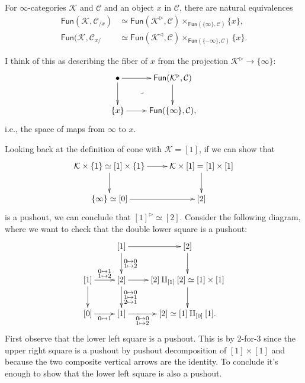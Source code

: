 \begin{lemma}
\label{lemma-pullback-cone}
For $\infty$-categories $\mathcal{K}$ and $\mathcal{C}$ 
and an object $x$ in $\mathcal{C}$,
there are natural equivalences
\begin{align*}
\mathsf{Fun}(\mathcal{K},\mathcal{C}_{/x})&\simeq
\mathsf{Fun}(\mathcal{K}^{\triangleright},\mathcal{C})
\times_{\mathsf{Fun}(\{\infty\},\mathcal{C})}\{x\},\\
\mathsf{Fun}(\mathcal{K},\mathcal{C}_{x/}&
\simeq \mathsf{Fun}(\mathcal{K}^{\triangleleft},\mathcal{C})
\times_{\mathsf{Fun}(\{-\infty\},\mathcal{C})}\{x\}.
\end{align*}
\end{lemma}

\noindent
I think of this as describing the fiber of $x$ from the
projection $\mathcal{K}^{\triangleright} \to \{\infty\}$:
$$
\xymatrix{
\bullet\ar[r]\ar[d]\ar@{}[dr]|-{\lrcorner}
&\mathsf{Fun}(\mathcal{K}^{\triangleright},\mathcal{C})\ar[d]\\
\{x\}\ar[r]&\mathsf{Fun}(\{\infty\},\mathcal{C}),
}
$$
i.e., the space of maps from $\infty$ to $x$.

\medskip\noindent
Looking back at the definition of cone
with $\mathcal{K}=[1]$,
if we can show that
$$
\xymatrix{
\mathcal{K}\times\{1\}\simeq[1]\times\{1\}\ar[r]\ar[d]
&\mathcal{K}\times[1]=[1]\times[1]\ar[d]\\
\{\infty\}\simeq[0]\ar[r]&[2]
}
$$
is a pushout, we can conclude that $[1]^{\triangleright}\simeq[2]$.
Consider the following diagram,
where we want to check that the double lower square is a pushout:
$$
\xymatrix{
&[1]\ar[r]\ar[d]^{\substack{0\mapsto 0 \\ 1\mapsto 2}}
&[2]\ar[d]\\
[1]\ar[d]\ar[r]^{\substack{0 \mapsto 1 \\ 1 \mapsto 2}}
&[2]\ar[r]\ar[d]^{\substack{0\mapsto 0 \\ 1 \mapsto 1\\2\mapsto 1}}
&[2]\amalg_{[1]}[2]\simeq[1]\times[1]\ar[d]\\
[0]\ar[r]_{0 \mapsto  1}&[1]\ar[r]_-{\substack{0 \mapsto 0 \\ 1 \mapsto 2}}&[2]\simeq[1]\amalg_{[0]}[1].
}
$$
First observe that the lower left square is a pushout.
This is by 2-for-3 since the upper right square is a pushout
by pushout decomposition of $[1]\times[1]$
and because the two composite vertical arrows are the identity.
To conclude it's enough to show that the lower left square
is also a pushout.

